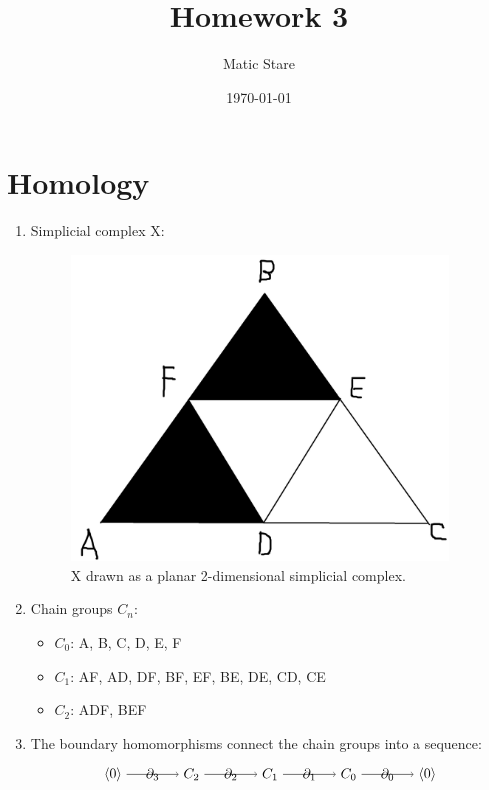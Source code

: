 \documentclass{article}
\title{Homework 3}
\author{Matic Stare}
\date{\today}
\begin{document}
\maketitle

\tableofcontents
\newpage

\section{Homology}\label{sec:p1}
\begin{enumerate}[label*=\alph*)]
    \item Simplicial complex X:
        \begin{figure}[H]
            \centering
            \includegraphics[width=10cm]{1a.png}
            \caption{X drawn as a planar 2-dimensional simplicial complex.}\label{fig:1a}
        \end{figure}
    \item Chain groups $C_n$:
        \begin{itemize}
            \item $C_0$: A, B, C, D, E, F
            \item $C_1$: AF, AD, DF, BF, EF, BE, DE, CD, CE
            \item $C_2$: ADF, BEF
        \end{itemize}
    
    \item The boundary homomorphisms connect the chain groups into a sequence:
    \begin{equation*}
        \begin{tikzpicture}[baseline=(current  bounding  box.center)]
            \node (01) at (-2, 0) {$\langle 0 \rangle$};
            \node (C2) at (0, 0) {$C_2$};
            \node (C1) at (2, 0) {$C_1$};
            \node (C0) at (4, 0) {$C_0$};
            \node (02) at (6, 0) {$\langle 0 \rangle$};
            \draw[->] (01) to node {$\partial_3$} (C2);
            \draw[->] (C2) to node {$\partial_2$} (C1);
            \draw[->] (C1) to node {$\partial_1$} (C0);
            \draw[->] (C0) to node {$\partial_0$} (02);
    \end{tikzpicture}
    \end{equation*}


\end{enumerate}
\end{document}
